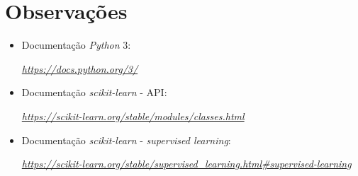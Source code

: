 \documentclass[a4paper]{report}
\begin{document}
\appendix
\chapter{Observações} \label{ch:Observations}
\begin{itemize}
    \item Documentação \textit{Python} 3:
	\par \textit{\url{https://docs.python.org/3/}}
	\item Documentação \textit{scikit-learn} - API:
    \par \textit{\url{https://scikit-learn.org/stable/modules/classes.html}}
	\item Documentação \textit{scikit-learn} - \textit{supervised learning}:
	\par \textit{\url{https://scikit-learn.org/stable/supervised_learning.html\#supervised-learning}}
\end{itemize}
\end{document}
